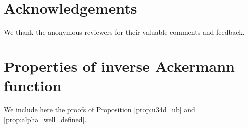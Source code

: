 \documentclass[11pt]{article}
\begin{document}

\section*{Acknowledgements}
We thank the anonymous reviewers for their valuable comments and feedback.





\appendix

\section{Properties of inverse Ackermann function}

\label{app:inverse_ack_properties}

We include here the proofs of Proposition \ref{prop:u34d_ub} and \ref{prop:alpha_well_defined}.
\end{document}
